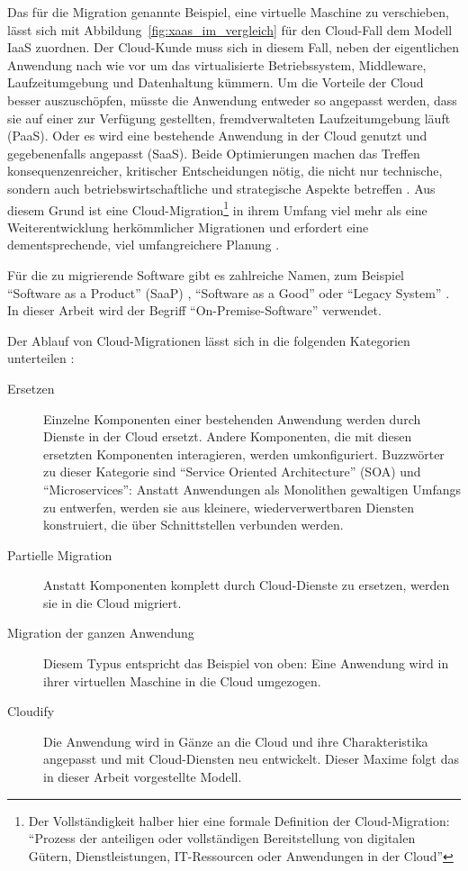 Das für die Migration genannte Beispiel, eine virtuelle Maschine zu
verschieben, lässt sich mit Abbildung~\ref{fig:xaas_im_vergleich} für den
Cloud-Fall dem Modell IaaS zuordnen. Der Cloud-Kunde muss sich in diesem Fall,
neben der eigentlichen Anwendung nach wie vor um das virtualisierte
Betriebssystem, Middleware, Laufzeitumgebung und Datenhaltung kümmern. Um die
Vorteile der Cloud besser auszuschöpfen, müsste die Anwendung entweder so
angepasst werden, dass sie auf einer zur Verfügung gestellten, fremdverwalteten
Laufzeitumgebung läuft (PaaS). Oder es wird eine bestehende Anwendung in der
Cloud genutzt und gegebenenfalls angepasst (SaaS). Beide Optimierungen
machen das Treffen konsequenzenreicher, kritischer Entscheidungen nötig, die 
nicht nur technische, sondern auch betriebswirtschaftliche und 
strategische Aspekte betreffen .
Aus diesem Grund ist eine Cloud-Migration\footnote{Der Vollständigkeit halber
hier eine formale Definition der Cloud-Migration: "`Prozess der anteiligen
oder
vollständigen Bereitstellung von digitalen Gütern, Dienstleistungen,
IT-Ressourcen oder Anwendungen in der Cloud"'}
 in ihrem Umfang viel mehr als eine Weiterentwicklung 
herkömmlicher Migrationen und erfordert eine dementsprechende, viel 
umfangreichere
Planung .

Für die zu migrierende Software gibt es zahlreiche Namen, zum Beispiel 
"`Software as a Product"' (SaaP) 
, "`Software as a Good"' 
 oder "`Legacy System"' 
. In dieser Arbeit wird 
der Begriff "`On-Premise-Software"' verwendet.

Der Ablauf von Cloud-Migrationen lässt sich in die folgenden Kategorien 
unterteilen : 
\begin{description}
	\item[Ersetzen] Einzelne Komponenten einer bestehenden Anwendung werden
durch Dienste in der Cloud ersetzt. Andere Komponenten, die mit diesen
ersetzten Komponenten interagieren, werden umkonfiguriert. Buzzwörter zu dieser 
Kategorie sind "`Service Oriented Architecture"' (SOA) und "`Microservices"': 
Anstatt Anwendungen als Monolithen gewaltigen Umfangs zu entwerfen, werden sie 
aus kleinere, wiederverwertbaren Diensten konstruiert, die über Schnittstellen 
verbunden werden.
	\item[Partielle Migration] Anstatt Komponenten komplett durch Cloud-Dienste zu
ersetzen, werden sie in die Cloud migriert.
	\item[Migration der ganzen Anwendung] Diesem Typus entspricht das 
Beispiel von oben: Eine Anwendung wird in ihrer virtuellen Maschine in die 
Cloud umgezogen.
	\item[Cloudify] Die Anwendung wird in Gänze an die Cloud und ihre
Charakteristika angepasst und mit Cloud-Diensten neu entwickelt. Dieser Maxime 
folgt das in dieser Arbeit vorgestellte Modell.
\end{description}

